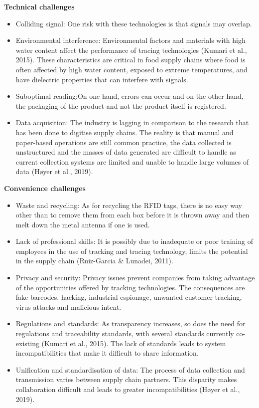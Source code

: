 \documentclass[
]{book}
\providecommand{\tightlist}{%
  \setlength{\itemsep}{0pt}\setlength{\parskip}{0pt}}
\begin{document}
\textbf{Technical challenges}

\begin{itemize}
\tightlist
\item
  Colliding signal: One risk with these technologies is that signals may overlap.
\item
  Environmental interference: Environmental factors and materials with high water content affect the performance of tracing technologies (Kumari et al., 2015). These characteristics are critical in food supply chains where food is often affected by high water content, exposed to extreme temperatures, and have dielectric properties that can interfere with signals.
\item
  Suboptimal reading:On one hand, errors can occur and on the other hand, the packaging of the product and not the product itself is registered.\\
\item
  Data acquisition: The industry is lagging in comparison to the research that has been done to digitise supply chains. The reality is that manual and paper-based operations are still common practice, the data collected is unstructured and the masses of data generated are difficult to handle as current collection systems are limited and unable to handle large volumes of data (Høyer et al., 2019).
\end{itemize}

\textbf{Convenience challenges}

\begin{itemize}
\tightlist
\item
  Waste and recycling: As for recycling the RFID tags, there is no easy way other than to remove them from each box before it is thrown away and then melt down the metal antenna if one is used.
\item
  Lack of professional skills: It is possibly due to inadequate or poor training of employees in the use of tracking and tracing technology, limits the potential in the supply chain (Ruiz-Garcia \& Lunadei, 2011).
\item
  Privacy and security: Privacy issues prevent companies from taking advantage of the opportunities offered by tracking technologies. The consequences are fake barcodes, hacking, industrial espionage, unwanted customer tracking, virus attacks and malicious intent.
\item
  Regulations and standards: As transparency increases, so does the need for regulations and traceability standards, with several standards currently co-existing (Kumari et al., 2015). The lack of standards leads to system incompatibilities that make it difficult to share information.
\item
  Unification and standardisation of data: The process of data collection and transmission varies between supply chain partners. This disparity makes collaboration difficult and leads to greater incompatibilities (Høyer et al., 2019).
\end{itemize}
\end{document}
